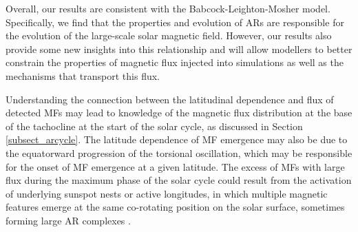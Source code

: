 \documentclass[namedreferences]{solarphysics}
\begin{document}
\begin{article}
\begin{enumerate}





\end{enumerate}
Overall, our results are consistent with the Babcock-Leighton-Mosher model. Specifically, we find that the properties and evolution of ARs are responsible for the evolution of the large-scale solar magnetic field. However, our results also provide some new insights into this relationship and will allow modellers to better constrain the properties of magnetic flux injected into simulations as well as the mechanisms that transport this flux.

Understanding the connection between the latitudinal dependence and flux of detected MFs may lead to knowledge of the magnetic flux distribution at the base of the tachocline at the start of the solar cycle, as discussed in Section\,\ref{subsect_arcycle}. The latitude dependence of MF emergence may also be due to the equatorward progression of the torsional oscillation, which may be responsible for the onset of MF emergence at a given latitude. The excess of MFs with large flux during the maximum phase of the solar cycle could result from the activation of underlying sunspot nests or active longitudes, in which multiple magnetic features emerge at the same co-rotating position on the solar surface, sometimes forming large AR complexes \citep{Gaizauskas:1983}.


\end{article}
\end{document}
